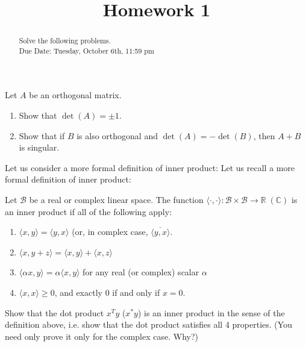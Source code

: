 \documentclass{ximera}
\begin{document}
    \title{Homework 1}
    
    \begin{abstract} Solve the following problems.
    \\
    Due Date: Tuesday, October 6th, 11:59 pm
    \end{abstract}
    \maketitle

    \begin{exercise}
        Let $A$ be an orthogonal matrix.  
        \begin{enumerate}
            \item Show that $\det(A) = \pm 1$.
            \item Show that if $B$ is also orthogonal and $\det(A) = -\det(B)$, then $A+B$ is singular.
        \end{enumerate}  
    \end{exercise}    

Let us consider a more formal definition of inner product:
Let us recall a more formal definition of inner product:
\begin{definition}
    Let $\mathcal{B}$ be a real or complex linear space.  The function $\langle \cdot, \cdot\rangle :\mathcal{B} \times \mathcal{B} \to \mathbb{R} \; (\mathbb{C})$ is an inner product if all of the following apply:
    \begin{enumerate}
        \item $\langle x, y \rangle = \langle y,x \rangle$ (or, in complex case, $\overline{\langle y,x\rangle}$.
        \item $\langle x, y+z \rangle = \langle x, y \rangle + \langle x, z \rangle$
        \item $\langle \alpha x, y \rangle = \alpha \langle x, y \rangle$ for any real (or complex) scalar $\alpha$
        \item $\langle x, x \rangle \geq 0$, and exactly $0$ if and only if $x = 0$.
    \end{enumerate}
\end{definition}
\begin{exercise}
    Show that the dot product $x^Ty$ ($x^*y$) is an inner product in the sense of the definition above, i.e. show that the dot product satisfies all 4 properties.  (You need only prove it only for the complex case. Why?)
\end{exercise}
\end{document}
